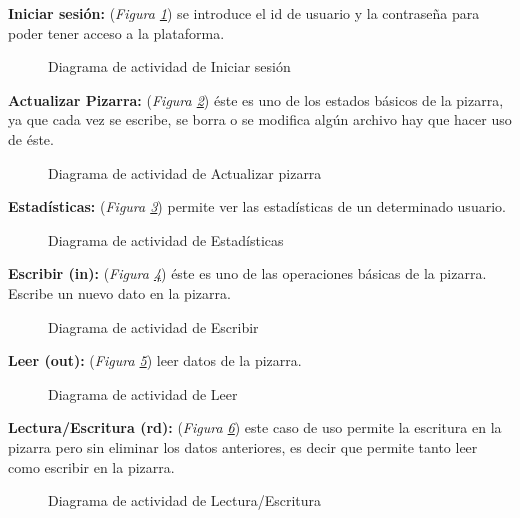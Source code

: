 \textbf{Iniciar sesión:} (\emph{Figura \ref{fig:iniciarSesion}}) se introduce el id de usuario y la contraseña para poder tener acceso a la plataforma.

\begin{figure}[H]
\centering
\iniciarSesion
\caption{Diagrama de actividad de Iniciar sesión}
\label{fig:iniciarSesion}
\end{figure}
\newpage

\textbf{Actualizar Pizarra:} (\emph{Figura \ref{fig:actualizarPizarra}}) éste es uno de los estados básicos de la pizarra, ya que cada vez se escribe, se borra o se modifica algún archivo hay que hacer uso de éste.

\begin{figure}[H]
\centering
\actualizarPizarra
\caption{Diagrama de actividad de Actualizar pizarra}
\label{fig:actualizarPizarra}
\end{figure}
\newpage

\textbf{Estadísticas:} (\emph{Figura \ref{fig:estadisticas}}) permite ver las estadísticas de un determinado usuario.

\begin{figure}[H]
\centering
\estadisticas
\caption{Diagrama de actividad de Estadísticas}
\label{fig:estadisticas}
\end{figure}
\newpage

\textbf{Escribir (in):} (\emph{Figura \ref{fig:escribir}}) éste es uno de las operaciones básicas de la pizarra. Escribe un nuevo dato en la pizarra.

\begin{figure}[H]
\centering
\escribir
\caption{Diagrama de actividad de Escribir}
\label{fig:escribir}
\end{figure}
\newpage

\textbf{Leer (out):} (\emph{Figura \ref{fig:leer}}) leer datos de la pizarra.

\begin{figure}[H]
\centering
\leer
\caption{Diagrama de actividad de Leer}
\label{fig:leer}
\end{figure}
\newpage

\textbf{Lectura/Escritura (rd):} (\emph{Figura \ref{fig:lecturaEscritura}}) este caso de uso permite la escritura en la pizarra pero sin eliminar los datos anteriores, es decir que permite tanto leer como escribir en la pizarra.

\begin{figure}[H]
\centering
\lecturaEscritura
\caption{Diagrama de actividad de Lectura/Escritura}
\label{fig:lecturaEscritura}
\end{figure}
\newpage

